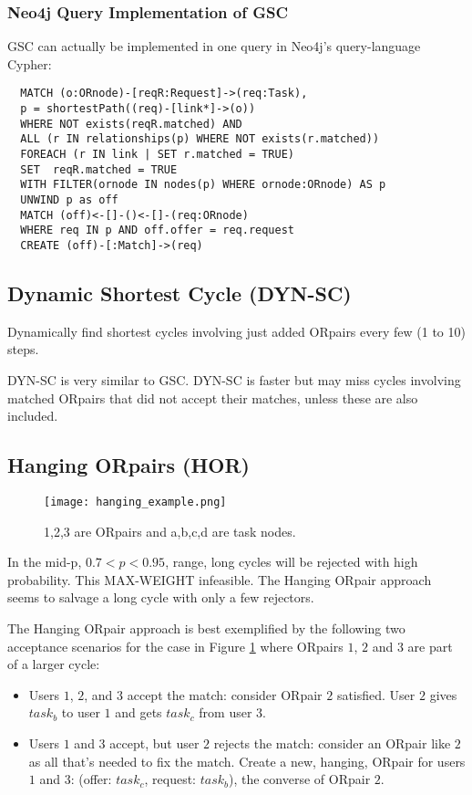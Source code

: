 \documentclass[main.tex]{subfiles}
\begin{document}
\subsubsection{Neo4j Query Implementation of GSC}
GSC can actually be implemented in one query in Neo4j's query-language Cypher:

\begin{verbatim}
  MATCH (o:ORnode)-[reqR:Request]->(req:Task),
  p = shortestPath((req)-[link*]->(o))
  WHERE NOT exists(reqR.matched) AND
  ALL (r IN relationships(p) WHERE NOT exists(r.matched)) 
  FOREACH (r IN link | SET r.matched = TRUE)
  SET  reqR.matched = TRUE
  WITH FILTER(ornode IN nodes(p) WHERE ornode:ORnode) AS p
  UNWIND p as off
  MATCH (off)<-[]-()<-[]-(req:ORnode)
  WHERE req IN p AND off.offer = req.request
  CREATE (off)-[:Match]->(req)
\end{verbatim}

\subsection{Dynamic Shortest Cycle (DYN-SC)}
Dynamically find shortest cycles involving just added ORpairs every few (1 to 10) steps.

DYN-SC is very similar to GSC. DYN-SC is faster but may miss cycles involving matched ORpairs that did not accept their matches, unless these are also included.

\subsection{Hanging ORpairs (HOR)}
\begin{figure}
  \texttt{[image: hanging\_example.png]}
  \caption{1,2,3 are ORpairs and a,b,c,d are task nodes.}
  \label{hanging_example}
\end{figure}

In the mid-p, $0.7 < p < 0.95$, range, long cycles will be rejected with high probability. This MAX-WEIGHT infeasible. The Hanging ORpair approach seems to salvage a long cycle with only a few rejectors.

The Hanging ORpair approach is best exemplified by the following two acceptance scenarios for the case in Figure \ref{hanging_example} where ORpairs $1$, $2$ and $3$ are part of a larger cycle:
\begin{itemize}
  \item Users $1$, $2$, and $3$ accept the match: consider ORpair $2$ satisfied. User $2$ gives $task_b$ to user $1$ and gets $task_c$ from user $3$.
  \item Users $1$ and $3$ accept, but user $2$ rejects the match: consider an ORpair like $2$ as all that's needed to fix the match. Create a new, hanging, ORpair for users $1$ and $3$: (offer: $task_c$, request: $task_b$), the converse of ORpair $2$.
\end{itemize}
\end{document}
